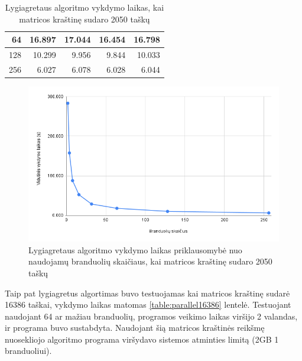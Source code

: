 \documentclass{VUMIFPSbakalaurinis}
\begin{document}
\begin{table}[H]
\begin{tabular}{|r|rrrr|}
        64                                                         & \multicolumn{1}{r|}{16.897}             & \multicolumn{1}{r|}{17.044}     & \multicolumn{1}{r|}{16.454}     & 16.798                        \\ \hline
        128                                                        & \multicolumn{1}{r|}{10.299}             & \multicolumn{1}{r|}{9.956}      & \multicolumn{1}{r|}{9.844}      & 10.033                        \\ \hline
        256                                                        & \multicolumn{1}{r|}{6.027}              & \multicolumn{1}{r|}{6.078}      & \multicolumn{1}{r|}{6.028}      & 6.044                         \\ \hline
    \end{tabular}
    \caption{Lygiagretaus algoritmo vykdymo laikas, kai matricos kraštinę sudaro 2050 taškų}
    \label{table:parallel2050}
\end{table}

\begin{figure}[H]
    \centering
    \includegraphics[scale=0.5]{img/parallel_time.png}
    \caption{Lygiagretaus algoritmo vykdymo laikas priklausomybė nuo naudojamų branduolių skaičiaus, kai matricos kraštinę sudaro 2050 taškų}
    \label{img:parallel_time}
\end{figure}


Taip pat lygiagretus algortimas buvo testuojamas kai matricos kraštinę sudarė 16386 taškai, vykdymo laikas matomas \ref{table:parallel16386} lentelė.
Testuojant naudojant 64 ar mažiau branduolių, programos veikimo laikas viršijo 2 valandas, ir programa buvo sustabdyta. 
Naudojant šią matricos kraštinės reikšmę nuosekliojo algoritmo programa viršydavo sistemos atminties limitą (2GB 1 branduoliui).
\end{document}
